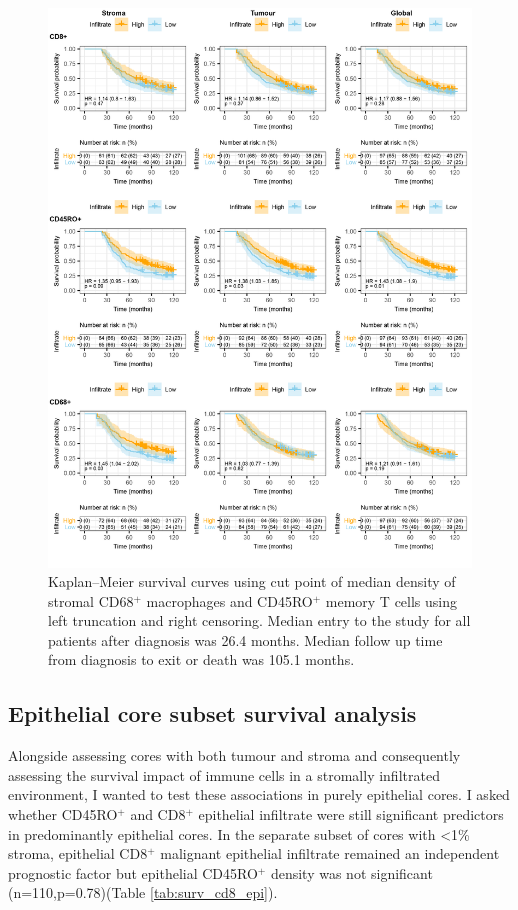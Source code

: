 \begin{figure}
    \centering
    \includegraphics{Chapter2/Figs/Raster/KM_allinf.png}
    \caption[KM Survival curves for individual infiltrates]{Kaplan–Meier survival curves using cut point of median density of stromal CD68$^+$ macrophages and CD45RO$^+$ memory T cells using left truncation and right censoring. Median entry to the study for all patients after diagnosis was 26.4 months. Median follow up time from diagnosis to exit or death was 105.1 months.}
    \label{fig:KM_infiltrates}
\end{figure}

\subsection{Epithelial core subset survival analysis}

Alongside assessing cores with both tumour and stroma and consequently assessing the survival impact of immune cells in a stromally infiltrated environment, I wanted to test these associations in purely epithelial cores. I asked whether CD45RO$^+$ and CD8$^+$ epithelial infiltrate were still significant predictors in predominantly epithelial cores. In the separate subset of cores with <1\% stroma, epithelial CD8$^+$ malignant epithelial infiltrate remained an independent prognostic factor but epithelial CD45RO$^+$ density was not significant (n=110,p=0.78)(Table \ref{tab:surv_cd8_epi}).

